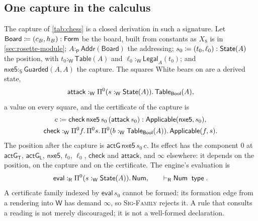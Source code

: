 \documentclass[11pt]{article}
\numberwithin{equation}{section}
\theoremstyle{definition}
\theoremstyle{plain}
\theoremstyle{remark}
\renewcommand{\Form}{\AFForm}
\newcommand{\State}{\AFState}
\newcommand{\Prs}{\mathsf P}
\newcommand{\Wit}{\mathsf W}
\newcommand{\Scr}{\mathsf S}
\newcommand{\Ren}{\mathsf R}
\newcommand{\absent}{\boldsymbol\infty}
\newcommand{\jtype}{\mathrel{\mathsf{type}}}
\begin{document}
\subsection{One capture in the calculus}\label{sec:capture}

The capture of \cref{tab:chess} is a closed derivation in such a signature.
Let
\(\mathsf{Board}\coloneqq(c_B,h_B):\Form\) be the board, built from constants
as \(X_8\) is in \cref{sec:rosette-module};
\(A:_{\Prs}\mathsf{Addr}(\mathsf{Board})\) the addressing;
\(s_0\coloneqq(t_0,\ell_0):\State(A)\) the position, with
\(t_0:_{\Wit}\mathsf{Table}(A)\) and \(\ell_0:_{\Wit}\mathsf{Legal}_A(t_0)\);
and \(\mathsf{nxe5}:_{\Scr}\mathsf{Guarded}(A,A)\) the capture.  The squares
White bears on are a derived state,
\[
 \mathsf{attack}:_{\Wit}
 \AFDepFun^0(s:_{\Wit}\State(A)).\,\mathsf{Table}_{\mathsf{Bool}}(A),
\]
a value on every square, and the certificate of the capture is
\[
\begin{gathered}
 c\coloneqq\mathsf{check}\,\mathsf{nxe5}\,s_0\,(\mathsf{attack}\,s_0)
 :\mathsf{Applicable}(\mathsf{nxe5},s_0),\\
 \mathsf{check}:_{\Wit}\AFDepFun^0 f.\,\AFDepFun^0 s.\,
 \AFDepFun^0(b:_{\Wit}\mathsf{Table}_{\mathsf{Bool}}(A)).\,
 \mathsf{Applicable}(f,s).
\end{gathered}
\]
The position after the capture is \(\mathsf{actG}\,\mathsf{nxe5}\,s_0\,c\).
Its effect has the component \(0\) at \(\mathsf{actG}_{\mathsf T}\),
\(\mathsf{actG}_{\mathsf L}\), \(\mathsf{nxe5}\), \(t_0\), \(\ell_0\),
\(\mathsf{check}\) and \(\mathsf{attack}\), and \(\absent\) elsewhere: it
depends on the position, on the capture and on the certificate.  The engine's
evaluation is
\[
 \mathsf{eval}:_{\Ren}\AFDepFun^0(s:_{\Wit}\State(A)).\,\mathsf{Num},
 \qquad
 \vdash_{\Ren}\mathsf{Num}\;\jtype .
\]
A certificate family indexed by \(\mathsf{eval}\,s_0\) cannot be formed: its
formation edge from a rendering into \(\Wit\) has demand \(\absent\), so
\textsc{Sig-Family} rejects it.  A rule that consults a reading is not merely
discouraged; it is not a well-formed declaration.
\end{document}
